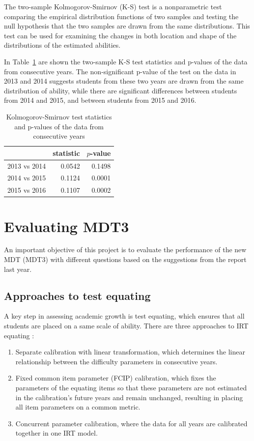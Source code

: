 \documentclass[a4paper]{report}
\begin{document}
The two-sample Kolmogorov-Smirnov (K-S) test is a nonparametric test comparing the empirical distribution functions of two samples and testing the null hypothesis that the two samples are drawn from the same distributions. This test can be used for examining the changes in both location and shape of the distributions of the estimated abilities. 

In Table~\ref{tab:GRTH_ks} are shown the two-sample K-S test statistics and p-values of the data from consecutive years. The non-significant p-value of the test on the data in 2013 and 2014 suggests students from these two years are drawn from the same distribution of ability, while there are significant differences between students from 2014 and 2015, and between students from 2015 and 2016. 

\begin{table}[ht]
  \centering
  \begin{tabular}{rrr}
    \hline
   & statistic & $p$-value \\ 
    \hline
  2013 vs 2014 & 0.0542 & 0.1498 \\ 
    2014 vs 2015 & 0.1124 & 0.0001 \\ 
    2015 vs 2016 & 0.1107 & 0.0002 \\ 
     \hline
  \end{tabular}
  \caption{\label{tab:GRTH_ks}Kolmogorov-Smirnov test statistics and p-values of the data from consecutive years}
\end{table}



\chapter{Evaluating MDT3}

An important objective of this project is to evaluate the performance of the new MDT (MDT3) with different questions based on the suggestions from the report last year. 

\section{Approaches to test equating}

A key step in assessing academic growth is test equating, which ensures that all students are placed on a same scale of ability. There are three approaches to IRT equating \cite{irtequating}: 

\begin{enumerate}
\item Separate calibration with linear transformation, which determines the linear relationship between the difficulty parameters in consecutive years. 
\item Fixed common item parameter (FCIP) calibration, which fixes the parameters of the equating items so that these parameters are not estimated in the calibration's future years and remain unchanged, resulting in placing all item parameters on a common metric. 
\item Concurrent parameter calibration, where the data for all years are calibrated together in one IRT model. 
\end{enumerate}
\end{document}
